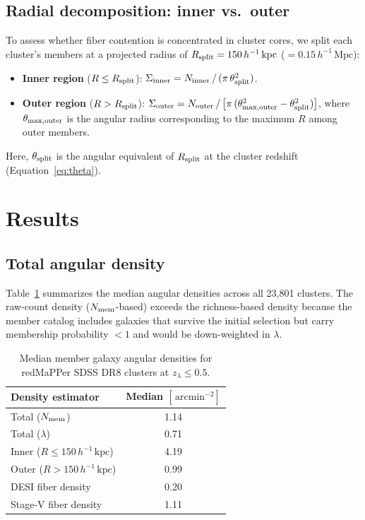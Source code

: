 \documentclass[12pt, letterpaper]{article}
\newcommand{\hmpc}{\,h^{-1}\,\mathrm{Mpc}}
\newcommand{\hkpc}{\,h^{-1}\,\mathrm{kpc}}
\newcommand{\arcminsq}{\,\mathrm{arcmin}^{-2}}
\newcommand{\lam}{\lambda}
\newcommand{\zlam}{z_\lambda}
\begin{document}
\subsection{Radial decomposition: inner vs.\ outer}

To assess whether fiber contention is concentrated in cluster cores, we
split each cluster's members at a projected radius of
$R_{\rm split} = 150\hkpc$ ($= 0.15\hmpc$):
\begin{itemize}
    \item \textbf{Inner region} ($R \leq R_{\rm split}$):
          $\Sigma_{\rm inner} = N_{\rm inner}\,/\,(\pi\,\theta_{\rm split}^2)$.
    \item \textbf{Outer region} ($R > R_{\rm split}$):
          $\Sigma_{\rm outer} = N_{\rm outer}\,/\,
          \bigl[\pi\,(\theta_{\rm max,outer}^2 - \theta_{\rm split}^2)\bigr]$,
          where $\theta_{\rm max,outer}$ is the angular radius
          corresponding to the maximum $R$ among outer members.
\end{itemize}
Here, $\theta_{\rm split}$ is the angular equivalent of $R_{\rm split}$
at the cluster redshift (Equation~\ref{eq:theta}).

\section{Results}
\label{sec:results}

\subsection{Total angular density}

Table~\ref{tab:summary} summarizes the median angular densities across
all 23{,}801 clusters.  The raw-count density ($N_{\rm mem}$-based)
exceeds the richness-based density because the member catalog includes
galaxies that survive the initial selection but carry membership
probability $< 1$ and would be down-weighted in $\lam$.

\begin{table}[h]
\centering
\caption{Median member galaxy angular densities for redMaPPer SDSS DR8
         clusters at $\zlam \leq 0.5$.}
\label{tab:summary}
\begin{tabular}{lc}
\toprule
Density estimator & Median $[\arcminsq]$ \\
\midrule
Total ($N_{\rm mem}$)               & 1.14 \\
Total ($\lam$)                      & 0.71 \\
Inner ($R \leq 150\hkpc$)           & 4.19 \\
Outer ($R > 150\hkpc$)              & 0.99 \\
\midrule
DESI fiber density                  & 0.20 \\
Stage-V fiber density               & 1.11 \\
\bottomrule
\end{tabular}
\end{table}
\end{document}
